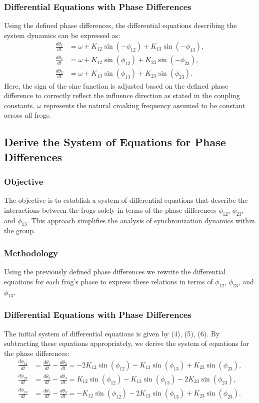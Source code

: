 \documentclass[12pt,a4paper]{article}
\begin{document}
\subsubsection{Differential Equations with Phase Differences}
Using the defined phase differences, the differential equations describing the system dynamics can be expressed as:
\begin{align}
\frac{d\theta_1}{dt} &= \omega + K_{12} \sin(-\phi_{12}) + K_{13} \sin(-\phi_{13}), \\
\frac{d\theta_2}{dt} &= \omega + K_{12} \sin(\phi_{12}) + K_{23} \sin(-\phi_{23}), \\
\frac{d\theta_3}{dt} &= \omega + K_{13} \sin(\phi_{13}) + K_{23} \sin(\phi_{23}).
\end{align}
Here, the sign of the sine function is adjusted based on the defined phase difference to correctly reflect the influence direction as stated in the coupling constants. $\omega$ represents the natural croaking frequency assumed to be constant across all frogs.

\subsection{Derive the System of Equations for Phase Differences}

\subsubsection{Objective}
The objective is to establish a system of differential equations that describe the interactions between the frogs solely in terms of the phase differences $\phi_{12}$, $\phi_{23}$, and $\phi_{13}$. This approach simplifies the analysis of synchronization dynamics within the group.

\subsubsection{Methodology}
Using the previously defined phase differences we rewrite the differential equations for each frog's phase to express these relations in terms of $\phi_{12}$, $\phi_{23}$, and $\phi_{13}$.

\subsubsection{Differential Equations with Phase Differences}
The initial system of differential equations is given by (4), (5), (6).
By subtracting these equations appropriately, we derive the system of equations for the phase differences:
\begin{align}
\frac{d\phi_{12}}{dt} &= \frac{d\theta_1}{dt} - \frac{d\theta_2}{dt} = -2K_{12} \sin(\phi_{12}) - K_{13} \sin(\phi_{13}) + K_{23} \sin(\phi_{23}), \\
\frac{d\phi_{23}}{dt} &= \frac{d\theta_2}{dt} - \frac{d\theta_3}{dt} = K_{12} \sin(\phi_{12}) - K_{13} \sin(\phi_{13}) - 2K_{23} \sin(\phi_{23}), \\
\frac{d\phi_{13}}{dt} &= \frac{d\theta_1}{dt} - \frac{d\theta_3}{dt} = -K_{12} \sin(\phi_{12}) - 2K_{13} \sin(\phi_{13}) + K_{23} \sin(\phi_{23}).
\end{align}
\end{document}
